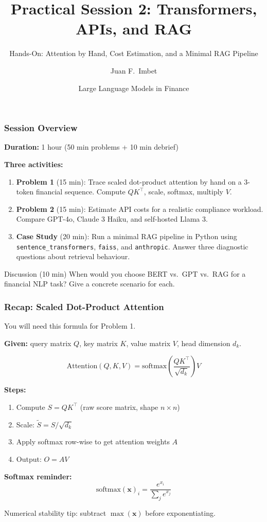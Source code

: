 \documentclass[9pt,t]{beamer}
\title{Practical Session 2: Transformers, APIs, and RAG}
\subtitle{Hands-On: Attention by Hand, Cost Estimation, and a Minimal RAG Pipeline}
\author{Juan F.\ Imbet}
\institute{Paris Dauphine -- PSL University}
\date{Large Language Models in Finance}
\begin{document}
\begin{frame}\titlepage\end{frame}

\begin{frame}
\frametitle{Session Overview}

\textbf{Duration:} 1 hour (50 min problems + 10 min debrief)

\medskip
\textbf{Three activities:}
\begin{enumerate}
  \item \textbf{Problem 1} (15 min): Trace scaled dot-product attention by hand on a
        3-token financial sequence. Compute $QK^\top$, scale, softmax, multiply $V$.
  \item \textbf{Problem 2} (15 min): Estimate API costs for a realistic compliance
        workload. Compare GPT-4o, Claude 3 Haiku, and self-hosted Llama 3.
  \item \textbf{Case Study} (20 min): Run a minimal RAG pipeline in Python using
        \texttt{sentence\_transformers}, \texttt{faiss}, and \texttt{anthropic}.
        Answer three diagnostic questions about retrieval behaviour.
\end{enumerate}

\medskip
\begin{block}{Discussion (10 min)}
When would you choose BERT vs.\ GPT vs.\ RAG for a financial NLP task?
Give a concrete scenario for each.
\end{block}
\end{frame}

\begin{frame}
\frametitle{Recap: Scaled Dot-Product Attention}

You will need this formula for Problem 1.

\medskip
\textbf{Given:} query matrix $Q$, key matrix $K$, value matrix $V$, head dimension $d_k$.

\[
\text{Attention}(Q, K, V) = \text{softmax}\!\left(\frac{QK^\top}{\sqrt{d_k}}\right) V
\]

\medskip
\textbf{Steps:}
\begin{enumerate}
  \item Compute $S = QK^\top$ \hfill (raw score matrix, shape $n \times n$)
  \item Scale: $\tilde{S} = S / \sqrt{d_k}$
  \item Apply softmax row-wise to get attention weights $A$
  \item Output: $O = AV$
\end{enumerate}

\medskip
\textbf{Softmax reminder:}
\[
\text{softmax}(\mathbf{x})_i = \frac{e^{x_i}}{\sum_j e^{x_j}}
\]

Numerical stability tip: subtract $\max(\mathbf{x})$ before exponentiating.
\end{frame}
\end{document}
